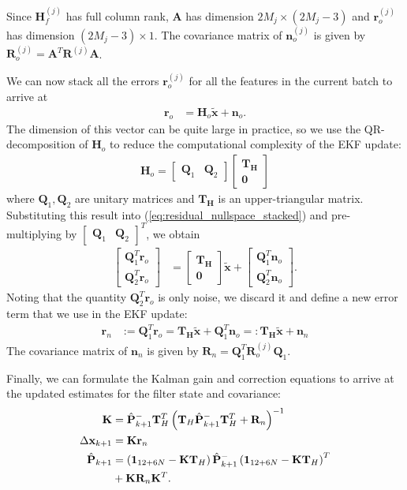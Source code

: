\documentclass[letterpaper, 10 pt, conference]{ieeeconf}  %
\def\Vec#1{\mathbf{#1}}
\newcommand{\bbm}{\begin{bmatrix}}
\newcommand{\ebm}{\end{bmatrix}}
\begin{document}
Since $\Vec{H}_{f}^{(j)}$ has full column rank, $\Vec{A}$ has dimension $2M_j \times \left(2M_j - 3\right)$ and $\Vec{r}_o^{(j)}$ has dimension $\left(2M_j - 3\right) \times 1$.
The covariance matrix of $\Vec{n}_o^{(j)}$ is given by $\Vec{R}_o^{(j)} = \Vec{A}^T\Vec{R}^{(j)}\Vec{A}$.

We can now stack all the errors $\Vec{r}_o^{(j)}$ for all the features in the current batch to arrive at
\begin{align} \label{eq:residual_nullspace_stacked}
    \Vec{r}_o &= \Vec{H}_o \widetilde{\Vec{x}} + \Vec{n}_o .
\end{align}
The dimension of this vector can be quite large in practice, so we use the QR-decomposition of $\Vec{H}_o$ to reduce the computational complexity of the EKF update:
\begin{align}
    \Vec{H}_o = \bbm \Vec{Q}_1 & \Vec{Q}_2 \ebm \bbm \Vec{T}_\Vec{H} \\ \Vec{0} \ebm
\end{align}
where $\Vec{Q}_1, \Vec{Q}_2$ are unitary matrices and $\Vec{T}_\Vec{H}$ is an upper-triangular matrix.
Substituting this result into (\ref{eq:residual_nullspace_stacked}) and pre-multiplying by $\bbm \Vec{Q}_1 & \Vec{Q}_2 \ebm ^T$, we obtain
\begin{align}
    \bbm \Vec{Q}_1^T \Vec{r}_o \\ \Vec{Q}_2^T \Vec{r}_o \ebm &= \bbm \Vec{T}_\Vec{H} \\ \Vec{0} \ebm \widetilde{\Vec{x}} + \bbm \Vec{Q}_1^T \Vec{n}_o \\ \Vec{Q}_2^T \Vec{n}_o \ebm .
\end{align}
Noting that the quantity $\Vec{Q}_2^T \Vec{r}_o$ is only noise, we discard it and define a new error term that we use in the EKF update:
\begin{align}
    \Vec{r}_n &:= \Vec{Q}_1^T \Vec{r}_o = \Vec{T}_\Vec{H} \widetilde{\Vec{x}} + \Vec{Q}_1^T \Vec{n}_o =: \Vec{T}_\Vec{H} \widetilde{\Vec{x}} + \Vec{n}_n
\end{align} 
The covariance matrix of $\Vec{n}_n$ is given by $\Vec{R}_n = \Vec{Q}_1^T \Vec{R}_o^{(j)} \Vec{Q}_1$.

Finally, we can formulate the Kalman gain and correction equations to arrive at the updated estimates for the filter state and covariance:
\begin{align}
    \Vec{K} &= \hat{\Vec{P}}^-_{k+1}\Vec{T}_{H}^T\left(\Vec{T}_{H}\hat{\Vec{P}}^-_{k+1}\Vec{T}_{H}^T + \Vec{R}_{n} \right)^{-1} \\
    \Delta\Vec{x}_{k+1} &= \Vec{K}\Vec{r}_{n} \\
    \hat{\Vec{P}}_{k+1} &= \left(\Vec{1}_{12+6N} - \Vec{K}\Vec{T}_{H} \right)\hat{\Vec{P}}^-_{k+1}\left(\Vec{1}_{12+6N} - \Vec{K}\Vec{T}_{H} \right)^T \notag \\ 
                        &+ \Vec{K}\Vec{R}_{n}\Vec{K}^T .
\end{align}
\end{document}
